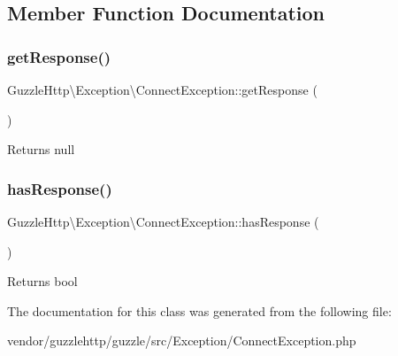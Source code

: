 \subsection{Member Function Documentation}
\mbox{\label{classGuzzleHttp_1_1Exception_1_1ConnectException_aa5e5fe243f9f4f314b1ba2cc16ef3497}} 
\subsubsection{\texorpdfstring{get\+Response()}{getResponse()}}
{\footnotesize\ttfamily Guzzle\+Http\textbackslash{}\+Exception\textbackslash{}\+Connect\+Exception\+::get\+Response (\begin{DoxyParamCaption}{ }\end{DoxyParamCaption})}

\begin{DoxyReturn}{Returns}
null 
\end{DoxyReturn}
\mbox{\label{classGuzzleHttp_1_1Exception_1_1ConnectException_a4829b9157171d7c801c2b80a690b11f2}} 
\subsubsection{\texorpdfstring{has\+Response()}{hasResponse()}}
{\footnotesize\ttfamily Guzzle\+Http\textbackslash{}\+Exception\textbackslash{}\+Connect\+Exception\+::has\+Response (\begin{DoxyParamCaption}{ }\end{DoxyParamCaption})}

\begin{DoxyReturn}{Returns}
bool 
\end{DoxyReturn}


The documentation for this class was generated from the following file\+:\begin{DoxyCompactItemize}
\item 
vendor/guzzlehttp/guzzle/src/\+Exception/Connect\+Exception.\+php\end{DoxyCompactItemize}
